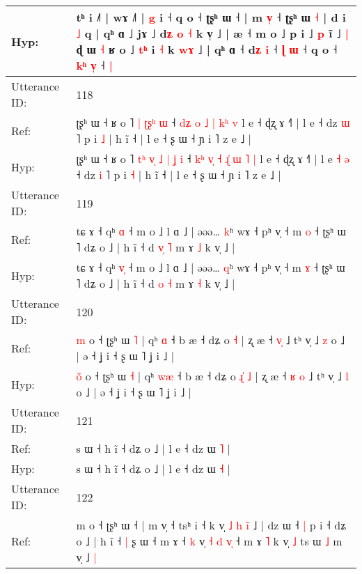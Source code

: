 \documentclass[10pt]{article}
\DeclareRobustCommand{\hl}[1]{{\textcolor{red}{#1}}}
\begin{document}
\begin{longtable}{ll}
Hyp: & tʰ i ˩˥ | wɤ ˩˥ | \hl{g} i ˧ q o ˧ ʈʂʰ ɯ ˧ | m \hl{v}\hl{̩} ˧ ʈʂʰ ɯ \hl{˧} | d i \hl{˩} q\hl{}\hl{}\hl{}\hl{} | qʰ ɑ ˩ jɤ ˩ d\hl{ʑ} \hl{o} \hl{˧} k v̩ ˩ |\hl{}\hl{}\hl{} æ ˧ m o ˩ p i ˩ \hl{p} ĩ ˩\hl{ }\hl{|} ɖ ɯ \hl{˧} ʁ o ˩ \hl{t}\hl{ʰ} i \hl{˧} k \hl{w}\hl{ɤ} ˩ | qʰ ɑ ˧ d\hl{ʑ} \hl{i} ˧ \hl{ɭ} \hl{}\hl{ɯ} ˧ q o ˧ \hl{k}\hl{ʰ} \hl{v}\hl{̩} ˧\hl{ }\hl{|}
 \\
\midrule
Utterance ID: & 118 \\
Ref: & ʈʂʰ ɯ ˧ ʁ o ˥\hl{}\hl{}\hl{}\hl{}\hl{}\hl{} \hl{|} \hl{ʈ}\hl{ʂ}\hl{ʰ} \hl{ɯ} ˧ \hl{d}\hl{ʑ} \hl{}\hl{o} \hl{˩} \hl{}\hl{|} \hl{}\hl{k}\hl{ʰ} \hl{v} l e ˧ ɖʐ ɤ ˧˥ | l e\hl{}\hl{}\hl{}\hl{} ˧ dz \hl{ɯ} ˥ p i \hl{˩} | h ĩ ˧ | l e ˧ ʂ ɯ ˧ ɲ i ˥ z e ˩ |
 \\
Hyp: & ʈʂʰ ɯ ˧ ʁ o ˥\hl{ }\hl{t}\hl{ʰ}\hl{ }\hl{v}\hl{̩} \hl{˩} \hl{|}\hl{ }\hl{ʝ} \hl{i} ˧ \hl{k}\hl{ʰ} \hl{v}\hl{̩} \hl{˧} \hl{ɻ}\hl{̍} \hl{ɯ}\hl{ }\hl{˥} \hl{|} l e ˧ ɖʐ ɤ ˧˥ | l e\hl{ }\hl{˧}\hl{ }\hl{ə} ˧ dz \hl{i} ˥ p i \hl{˧} | h ĩ ˧ | l e ˧ ʂ ɯ ˧ ɲ i ˥ z e ˩ |
 \\
\midrule
Utterance ID: & 119 \\
Ref: & tɕ ɤ ˧ qʰ \hl{}\hl{ɑ} ˧ m o ˩ l ɑ ˩ | əəə… \hl{k}ʰ wɤ ˧ pʰ v̩ ˧ m \hl{o} ˧ ʈʂʰ ɯ ˥ dʑ o ˩ | h ĩ ˧ d \hl{v}\hl{̩} \hl{˥} m ɤ \hl{˩} k v̩ ˩ |
 \\
Hyp: & tɕ ɤ ˧ qʰ \hl{v}\hl{̩} ˧ m o ˩ l ɑ ˩ | əəə… \hl{q}ʰ wɤ ˧ pʰ v̩ ˧ m \hl{ɤ} ˧ ʈʂʰ ɯ ˥ dʑ o ˩ | h ĩ ˧ d \hl{}\hl{o} \hl{˧} m ɤ \hl{˧} k v̩ ˩ |
 \\
\midrule
Utterance ID: & 120 \\
Ref: & \hl{}\hl{m} o ˧ ʈʂʰ ɯ \hl{˥} | qʰ \hl{}\hl{ɑ} ˧ b æ ˧ dʑ o\hl{}\hl{}\hl{} \hl{˧} | ʐ æ ˧ \hl{}\hl{v}\hl{̩} ˩ tʰ v̩ ˩ \hl{z} o ˩ | ə ˧ ʝ i ˧ ʂ ɯ ˥ ʝ i ˩ |
 \\
Hyp: & \hl{o}\hl{̃} o ˧ ʈʂʰ ɯ \hl{˧} | qʰ \hl{w}\hl{æ} ˧ b æ ˧ dʑ o\hl{ }\hl{ɻ}\hl{̍} \hl{˩} | ʐ æ ˧ \hl{ʁ}\hl{ }\hl{o} ˩ tʰ v̩ ˩ \hl{l} o ˩ | ə ˧ ʝ i ˧ ʂ ɯ ˥ ʝ i ˩ |
 \\
\midrule
Utterance ID: & 121 \\
Ref: & s ɯ ˧ h ĩ ˧ dʑ o ˩ | l e ˧ dz ɯ \hl{˥} |
 \\
Hyp: & s ɯ ˧ h ĩ ˧ dʑ o ˩ | l e ˧ dz ɯ \hl{˧} |
 \\
\midrule
Utterance ID: & 122 \\
Ref: & m o ˧ ʈʂʰ ɯ ˧ | m v̩ ˧ tsʰ i ˧ k v̩\hl{ }\hl{˩}\hl{ }\hl{h}\hl{ }\hl{i}\hl{̃} ˩ | dz ɯ ˧\hl{ }\hl{|} p i ˧ dʑ o ˩ | h ĩ ˧\hl{ }\hl{|} ʂ ɯ ˧ m ɤ ˧ \hl{k} v̩\hl{}\hl{} \hl{˧} \hl{d} \hl{}\hl{v}\hl{̩} ˧ m ɤ \hl{˥} k v̩ \hl{˩} ts ɯ\hl{}\hl{} \hl{˩} m v̩ ˩\hl{ }\hl{|}

\end{longtable}
\end{document}

